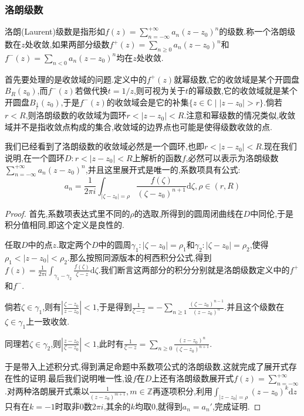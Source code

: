 \subsubsection{洛朗级数}

洛朗(Laurent)级数是指形如$f(z)=\sum_{n=-\infty}^{+\infty}a_n(z-z_0)^n$的级数.称一个洛朗级数在$z$处收敛,如果两部分级数$f^+(z)=\sum_{n\ge 0}a_n(z-z_0)^n$和$f^-(z)=\sum_{n<0}a_n(z-z_0)^n$均在$z$处收敛.

首先要处理的是收敛域的问题.定义中的$f^+(z)$就幂级数,它的收敛域是某个开圆盘$B_R(z_0)$,而$f^-(z)$若做代换$t=1/z$,则可视为关于$t$的幂级数,它的收敛域就是某个开圆盘$B_{\frac{1}{r}}(z_0)$,于是$f^-(z)$的收敛域会是它的补集$\{z\in\mathbb{C}\mid |z-z_0|>r\}$.倘若$r<R$,则洛朗级数的收敛域为圆环$r<|z-z_0|<R$.注意和幂级数的情况类似,收敛域并不是指收敛点构成的集合,收敛域的边界点也可能是使得级数收敛的点.

我们已经看到了洛朗级数的收敛域必然是一个圆环,也即$r<|z-z_0|<R$.现在我们说明,在一个圆环$D:r<|z-z_0|<R$上解析的函数$f$,必然可以表示为洛朗级数$\sum_{n=-\infty}^{+\infty}a_n(z-z_0)^n$,并且这里展开式是唯一的,系数项具有公式:
$$a_n=\frac{1}{2\pi i}\int_{|\zeta-z_0|=\rho}\frac{f(\zeta)}{(\zeta-z_0)^{n+1}}\mathrm{d}\zeta,\rho\in(r,R)$$
\begin{proof}
	
	首先,系数项表达式里不同的$\rho$的选取,所得到的圆周闭曲线在$D$中同伦,于是积分值相同,即这个定义是良性的.
	
	任取$D$中的点$z$.取定两个$D$中的圆周$\gamma_1:|\zeta-z_0|=\rho_1$和$\gamma_2:|\zeta-z_0|=\rho_2$,使得$\rho_1<|z-z_0|<\rho_2$.那么按照同源版本的柯西积分公式,得到$f(z)=\frac{1}{2\pi i}\int_{\gamma_1-\gamma_2}\frac{f(\zeta)}{\zeta-z}\mathrm{d}\zeta$.我们断言这两部分的积分分别就是洛朗级数定义中的$f^+$和$f^-$.
	
	倘若$\zeta\in\gamma_1$,则有$|\frac{\zeta-z_0}{z-z_0}|<1$,于是得到$\frac{1}{\zeta-z}=-\sum_{n\ge1}\frac{(\zeta-z_0)^{n-1}}{(z-z_0)^n}$.并且这个级数在$\zeta\in\gamma_1$上一致收敛.
	
	同理若$\zeta\in\gamma_2$,则$|\frac{z-z_0}{\zeta-z_0}|<1$,此时有$\frac{1}{\zeta-z}=\sum_{n\ge0}\frac{(z-z_0)^n}{(\zeta-z_0)^{n+1}}$.
	
	于是带入上述积分式,得到满足命题中系数项公式的洛朗级数,这就完成了展开式存在性的证明.最后我们说明唯一性,设$f$在$D$上还有洛朗级数展开式$f(z)=\sum_{n=-\infty}^{+\infty}$.对两种洛朗展开式乘以$\frac{1}{(z-z_0)^{m+1}},m\in\mathbb{Z}$再逐项积分,利用$\int_{|z-z_0|=\rho}(z-z_0)^k\mathrm{d}z$只有在$k=-1$时取非0数$2\pi i$,其余的$k$均取0,就得到$a_n=a_n'$,完成证明.
\end{proof}
